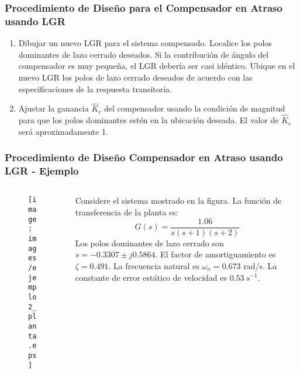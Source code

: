 \documentclass[aspectratio=169,handout]{beamer}
\theoremstyle{definition}
\theoremstyle{plain}
\theoremstyle{remark}
\newcounter{saveenumi}
\newcommand{\conti}{\setcounter{enumi}{\value{saveenumi}}}
\begin{document}
\begin{frame}[<+->]\frametitle{Procedimiento de Diseño para el Compensador en Atraso usando LGR}
	\begin{enumerate}
		\conti
		\item Dibujar un nuevo LGR para el sistema compensado. Localice los polos dominantes de lazo cerrado deseados. Si la contribución de ángulo del compensador es muy pequeña, el LGR debería ser casi idéntico. Ubique en el nuevo LGR los polos de lazo cerrado deseados de acuerdo con las especificaciones de la respuesta transitoria.
		\item Ajustar la ganancia $\hat{K}_c$ del compensador usando la condición de magnitud para que los polos dominantes estén en la ubicación deseada. El valor de $\hat{K}_c$ será aproximadamente 1.
	\end{enumerate}
\end{frame}


\begin{frame}[c]\frametitle{Procedimiento de Diseño Compensador en Atraso usando LGR - Ejemplo}
\begin{columns}
	\begin{column}{0.4\textwidth}
		\begin{figure}
			\texttt{[image: images/ejemplo2\_planta.eps]}
		\end{figure}
	\end{column}
	\begin{column}{0.6\textwidth}
		Considere el sistema mostrado en la figura. La función de transferencia de la planta es:
		\begin{equation*}
			G(s) = \frac{1.06}{s(s+1)(s+2)}
		\end{equation*}
		\pause	
		Los polos dominantes de lazo cerrado son $s = -0.3307 \pm j0.5864$. El factor de amortiguamiento es $\zeta = 0.491$. La frecuencia natural es $\omega_n = 0.673$ rad/s. La constante de error estático de velocidad es $0.53\ s^{-1}$.
	\end{column}
\end{columns}
\end{frame}
\end{document}
